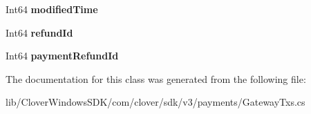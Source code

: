 \begin{DoxyCompactItemize}
Int64 {\bfseries modified\+Time}
\item 
\mbox{\label{classcom_1_1clover_1_1sdk_1_1v3_1_1payments_1_1_gateway_txs_af4f9f68e41f416cb44e559c0928d39a7}} 
Int64 {\bfseries refund\+Id}
\item 
\mbox{\label{classcom_1_1clover_1_1sdk_1_1v3_1_1payments_1_1_gateway_txs_ad58cab1362ffd6f8f86fb9ced7db8622}} 
Int64 {\bfseries payment\+Refund\+Id}
\end{DoxyCompactItemize}


The documentation for this class was generated from the following file\+:\begin{DoxyCompactItemize}
\item 
lib/\+Clover\+Windows\+S\+D\+K/com/clover/sdk/v3/payments/Gateway\+Txs.\+cs\end{DoxyCompactItemize}
